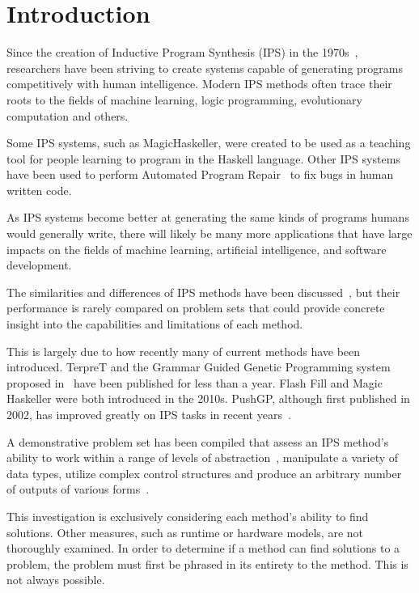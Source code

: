 \section{Introduction}

Since the creation of Inductive Program Synthesis (IPS) in the 1970s~\cite{Kitzelmann2009}, researchers have been striving to create systems capable of generating programs competitively with human intelligence. Modern IPS methods often trace their roots to the fields of machine learning, logic programming, evolutionary computation and others.

Some IPS systems, such as MagicHaskeller, were created to be used as a teaching tool for people learning to program in the Haskell language. Other IPS systems have been used to perform Automated Program Repair~\cite{Perelman2014} to fix bugs in human written code.

As IPS systems become better at generating the same kinds of programs humans would generally write, there will likely be many more applications that have large impacts on the fields of machine learning, artificial intelligence, and software development.

The similarities and differences of IPS methods have been discussed~\cite{Kitzelmann2009}, but their performance is rarely compared on problem sets that could provide concrete insight into the capabilities and limitations of each method.

This is largely due to how recently many of current methods have been introduced. TerpreT and the Grammar Guided Genetic Programming system proposed in~\cite{Forstenlechner:2017:eurogp} have been published for less than a year. Flash Fill and Magic Haskeller were both introduced in the 2010s. PushGP, although first published in 2002, has improved greatly on IPS tasks in recent years~\cite{Helmuth2015a}.

A demonstrative problem set has been compiled that assess an IPS method's ability to work within a range of levels of abstraction~\cite{Gaunt2016}, manipulate a variety of data types, utilize complex control structures and produce an arbitrary number of outputs of various forms~\cite{Helmuth2015b}.

This investigation is exclusively considering each method's ability to find solutions. Other measures, such as runtime or hardware models, are not thoroughly examined. In order to determine if a method can find solutions to a problem, the problem must first be phrased in its entirety to the method. This is not always possible.


